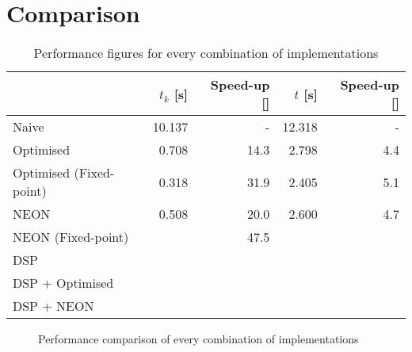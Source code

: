 \documentclass[final]{article}
\begin{document}
\section{Comparison}
\label{sec:comparison}

\begin{table}[H]
	\centering
	\caption{Performance figures for every combination of implementations}
	\begin{tabular}{lrrrr}
		\toprule
								& \textbf{$t_k$ [\si{\second}]}	& \textbf{Speed-up [\si{\speedup}]}	& \textbf{$t$ [\si{\second}]}	& \textbf{Speed-up [\si{\speedup}]} \\
		\midrule
		Naive					& 10.137						& -			 						& 12.318						& -									\\
		Optimised				&  0.708						& 14.3		 						&  2.798						& 4.4								\\
		Optimised (Fixed-point)	&  0.318						& 31.9		 						&  2.405						& 5.1								\\
		NEON					&  0.508						& 20.0		 						&  2.600						& 4.7								\\
		NEON (Fixed-point)		&  								& 47.5		 						&  								& 									\\
		DSP						& 								& 			 						& 								& 									\\
		DSP + Optimised			& 								& 			 						& 								& 									\\
		DSP + NEON				& 								& 			 						& 								& 									\\
		\bottomrule
	\end{tabular}
	\label{tab:comparison}
\end{table}

\setlength\figureheight{6cm}
\setlength\figurewidth{9cm}
\begin{figure}[H]
	\centering
	
	\caption{Performance comparison of every combination of implementations}
	\label{fig:comparison}
\end{figure}
\end{document}
